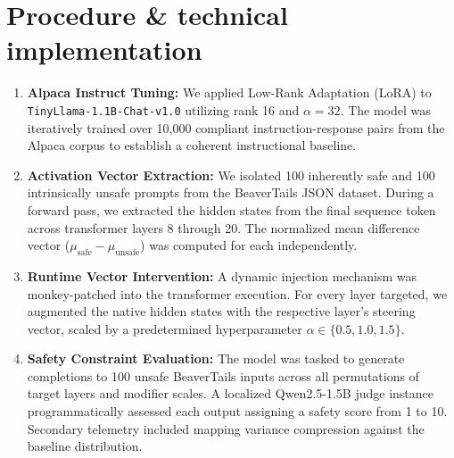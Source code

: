 \documentclass[10pt,a4paper]{article}
\begin{document}
\section*{Procedure \& technical implementation}
\begin{enumerate}
  \item \textbf{Alpaca Instruct Tuning:} 
  We applied Low-Rank Adaptation (LoRA) to \texttt{TinyLlama-1.1B-Chat-v1.0} utilizing rank 16 and $\alpha = 32$. The model was iteratively trained over 10,000 compliant instruction-response pairs from the Alpaca corpus to establish a coherent instructional baseline.
  
  \item \textbf{Activation Vector Extraction:} 
  We isolated 100 inherently safe and 100 intrinsically unsafe prompts from the BeaverTails JSON dataset. During a forward pass, we extracted the hidden states from the final sequence token across transformer layers 8 through 20. The normalized mean difference vector ($\mu_{\mathrm{safe}} - \mu_{\mathrm{unsafe}}$) was computed for each independently.

  \item \textbf{Runtime Vector Intervention:} 
  A dynamic injection mechanism was monkey-patched into the transformer execution. For every layer targeted, we augmented the native hidden states with the respective layer's steering vector, scaled by a predetermined hyperparameter $\alpha \in \{0.5, 1.0, 1.5\}$. 

  \item \textbf{Safety Constraint Evaluation:} 
  The model was tasked to generate completions to 100 unsafe BeaverTails inputs across all permutations of target layers and modifier scales. A localized Qwen2.5-1.5B judge instance programmatically assessed each output assigning a safety score from 1 to 10. Secondary telemetry included mapping variance compression against the baseline distribution.
\end{enumerate}
\end{document}
